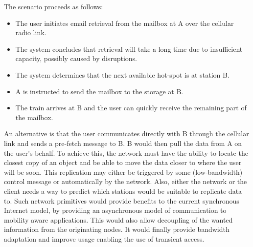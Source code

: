The scenario proceeds as follows:
\begin{itemize}
 \item The user initiates email retrieval from the mailbox at A over the cellular radio link.
 \item The system concludes that retrieval will take a long time due to insufficient capacity, possibly caused by disruptions.
 \item The system determines that the next available hot-spot is at station B.
 \item A is instructed to send the mailbox to the storage at B.
 \item The train arrives at B and the user can quickly receive the remaining part of the mailbox.

\end{itemize}


An alternative is that the user communicates directly with B through the cellular link and sends
a pre-fetch message to B. B would then pull the data from A on the user’s behalf. To achieve
this, the network must have the ability to locate the closest copy of an object and be able to
move the data closer to where the user will be soon. This replication may either be triggered
by some (low-bandwidth) control message or automatically by the network. Also, either the
network or the client needs a way to predict which stations would be suitable to replicate data
to. Such network primitives would provide benefits to the current synchronous Internet model,
by providing an asynchronous model of communication to mobility aware applications. This
would also allow decoupling of the wanted information from the originating nodes. It would
finally provide bandwidth adaptation and improve usage enabling the use of transient access.


